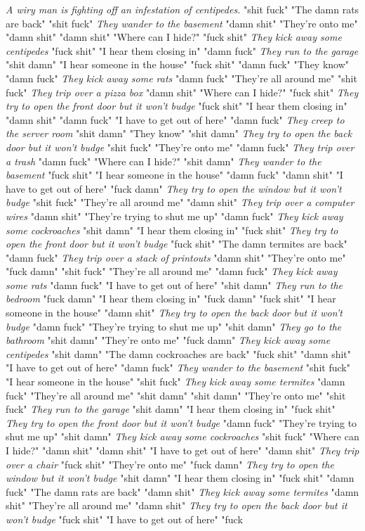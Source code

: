 \documentclass{report}
\begin{document}
\textit{A wiry man is fighting off an infestation of centipedes.} "shit fuck" "The damn rats are back" "shit fuck" \textit{They wander to the basement} "damn shit" "They're onto me" "damn shit" \textit{} "damn shit" "Where can I hide?" "fuck shit" \textit{They kick away some centipedes} "fuck shit" "I hear them closing in" "damn fuck" \textit{They run to the garage} "shit damn" "I hear someone in the house" "fuck shit" \textit{} "damn fuck" "They know" "damn fuck" \textit{They kick away some rats} "damn fuck" "They're all around me" "shit fuck" \textit{They trip over a pizza box} "damn shit" "Where can I hide?" "fuck shit" \textit{They try to open the front door but it won't budge} "fuck shit" "I hear them closing in" "damn shit" \textit{} "damn fuck" "I have to get out of here" "damn fuck" \textit{They creep to the server room} "shit damn" "They know" "shit damn" \textit{They try to open the back door but it won't budge} "shit fuck" "They're onto me" "damn fuck" \textit{They trip over a trash} "damn fuck" "Where can I hide?" "shit damn" \textit{They wander to the basement} "fuck shit" "I hear someone in the house" "damn fuck" \textit{} "damn shit" "I have to get out of here" "fuck damn" \textit{They try to open the window but it won't budge} "shit fuck" "They're all around me" "damn shit" \textit{They trip over a computer wires} "damn shit" "They're trying to shut me up" "damn fuck" \textit{They kick away some cockroaches} "shit damn" "I hear them closing in" "fuck shit" \textit{They try to open the front door but it won't budge} "fuck shit" "The damn termites are back" "damn fuck" \textit{They trip over a stack of printouts} "damn shit" "They're onto me" "fuck damn" \textit{} "shit fuck" "They're all around me" "damn fuck" \textit{They kick away some rats} "damn fuck" "I have to get out of here" "shit damn" \textit{They run to the bedroom} "fuck damn" "I hear them closing in" "fuck damn" \textit{} "fuck shit" "I hear someone in the house" "damn shit" \textit{They try to open the back door but it won't budge} "damn fuck" "They're trying to shut me up" "shit damn" \textit{They go to the bathroom} "shit damn" "They're onto me" "fuck damn" \textit{They kick away some centipedes} "shit damn" "The damn cockroaches are back" "fuck shit" \textit{} "damn shit" "I have to get out of here" "damn fuck" \textit{They wander to the basement} "shit fuck" "I hear someone in the house" "shit fuck" \textit{They kick away some termites} "damn fuck" "They're all around me" "shit damn" \textit{} "shit damn" "They're onto me" "shit fuck" \textit{They run to the garage} "shit damn" "I hear them closing in" "fuck shit" \textit{They try to open the front door but it won't budge} "damn fuck" "They're trying to shut me up" "shit damn" \textit{They kick away some cockroaches} "shit fuck" "Where can I hide?" "damn shit" \textit{} "damn shit" "I have to get out of here" "damn shit" \textit{They trip over a chair} "fuck shit" "They're onto me" "fuck damn" \textit{They try to open the window but it won't budge} "shit damn" "I hear them closing in" "fuck shit" \textit{} "damn fuck" "The damn rats are back" "damn shit" \textit{They kick away some termites} "damn shit" "They're all around me" "damn shit" \textit{They try to open the back door but it won't budge} "fuck shit" "I have to get out of here" "fuck 
\end{document}
